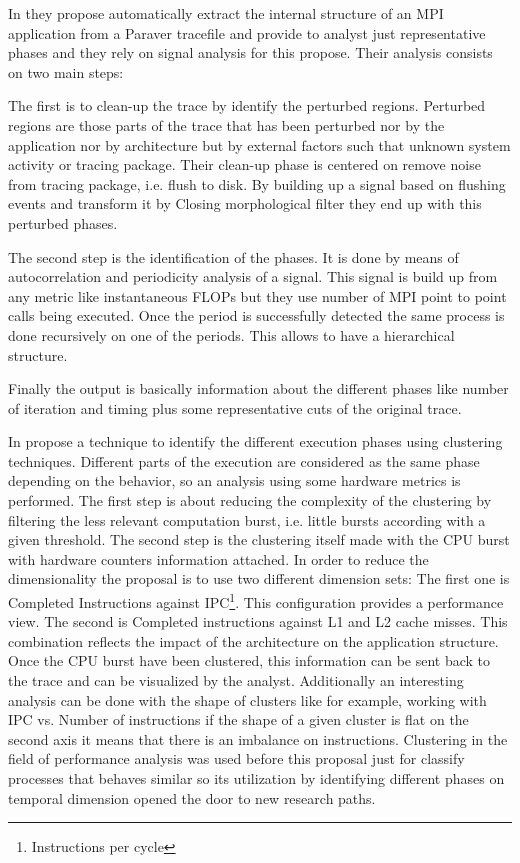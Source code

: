 In \cite{casas2007automatic} they propose 
automatically extract the internal structure of an MPI application from a
Paraver tracefile and provide to analyst just representative phases and they 
rely on signal analysis for this propose. 
Their analysis consists on two main steps:
\begin{enumerate*}[label=\roman*)]
    \item The first is to clean-up the trace by identify the perturbed regions.
Perturbed regions are those parts of the trace that has been perturbed nor by
the application nor by architecture but by external factors such that unknown
system activity or tracing package. Their clean-up phase is centered on remove
noise from tracing package, i.e. flush to disk. By building up a signal based
on flushing events and transform it by Closing morphological filter they end up
with this perturbed phases. 
    \item The second step is the identification of the
phases. It is done by means of autocorrelation and periodicity analysis of a
signal. This signal is build up from any metric like instantaneous FLOPs but
they use number of MPI point to point calls being executed. Once the period is
successfully detected the same process is done recursively on one of the
periods. This allows to have a hierarchical structure. 
\end{enumerate*}
Finally the output is
basically information about the different phases like number of iteration and
timing plus some representative cuts of the original trace. 

In \cite{gonzalez2013application} propose a
technique to identify the different execution phases using clustering 
techniques. Different parts of the
execution are considered as the same phase depending on the behavior,
so an analysis using some hardware metrics is
performed. The first step is about reducing the complexity of the clustering by
filtering the less relevant computation burst, i.e. little bursts according
with a given threshold. The second step is the clustering itself made with the 
CPU burst with hardware counters information attached. In order to 
reduce the dimensionality the proposal is to
use two different dimension sets: The first one is Completed Instructions
against IPC\footnote{Instructions per cycle}. This configuration provides a
performance view. The second is Completed instructions against L1 and L2 cache
misses. This combination reflects the impact of the architecture on the
application structure. Once the CPU burst have been clustered, this information
can be sent back to the trace and can be visualized by the analyst. Additionally
an interesting analysis can be done with the shape of clusters like for example,
working with IPC vs. Number of instructions if the shape of a given cluster is
flat on the second axis it means that there is an imbalance on instructions.
Clustering in the field of performance analysis was used before this proposal 
just for classify processes that behaves similar so its utilization by
identifying different phases on temporal dimension opened the door to new research
paths.

